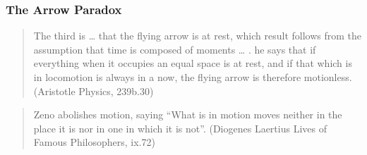 \documentclass[]{article}
\begin{document}
\subsubsection{The Arrow Paradox}\label{the-arrow-paradox}

\begin{quote}
The third is \ldots{} that the flying arrow is at rest, which result
follows from the assumption that time is composed of moments \ldots{} .
he says that if everything when it occupies an equal space is at rest,
and if that which is in locomotion is always in a now, the flying arrow
is therefore motionless. (Aristotle Physics, 239b.30)
\end{quote}

\begin{quote}
Zeno abolishes motion, saying ``What is in motion moves neither in the
place it is nor in one in which it is not''. (Diogenes Laertius Lives of
Famous Philosophers, ix.72)
\end{quote}
\end{document}

